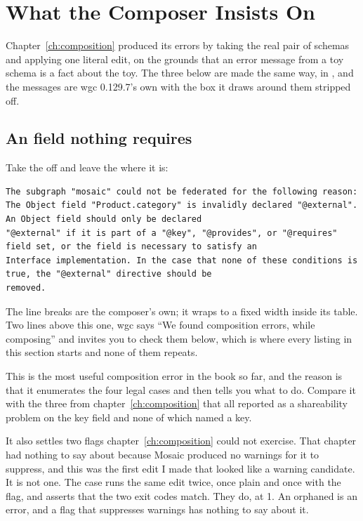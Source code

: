 \section{What the Composer Insists On}
\label{sec:ch11-what-the-composer-insists-on}
%

Chapter~\ref{ch:composition} produced its errors by taking the real pair of
schemas and applying one literal edit, on the grounds that an error message
from a toy schema is a fact about the toy. The three below are made the same
way, in , and the messages are wgc 0.129.7's own
with the box it draws around them stripped off.

\subsection*{An  field nothing requires}

Take the  off  and leave the
 where it is:

\begin{verbatim}
The subgraph "mosaic" could not be federated for the following reason:
The Object field "Product.category" is invalidly declared "@external". An Object field should only be declared
"@external" if it is part of a "@key", "@provides", or "@requires" field set, or the field is necessary to satisfy an
Interface implementation. In the case that none of these conditions is true, the "@external" directive should be
removed.
\end{verbatim}

The line breaks are the composer's own; it wraps to a fixed width inside its
table. Two lines above this one, wgc says \enquote{We found composition errors,
while composing} and invites you to check them below, which is where every
listing in this section starts and none of them repeats.

%
This is the most useful composition error in the book so far, and the reason is
that it enumerates the four legal cases and then tells you what to do. Compare
it with the three from chapter~\ref{ch:composition} that all reported as a
shareability problem on the key field and none of which named a key.

%
It also settles two flags chapter~\ref{ch:composition} could not exercise. That
chapter had nothing to say about  because Mosaic
produced no warnings for it to suppress, and this was the first edit I made
that looked like a warning candidate. It is not one. The case runs the same
edit twice, once plain and once with the flag, and asserts that the two exit
codes match. They do, at 1. An orphaned  is an error, and a
flag that suppresses warnings has nothing to say about it.

